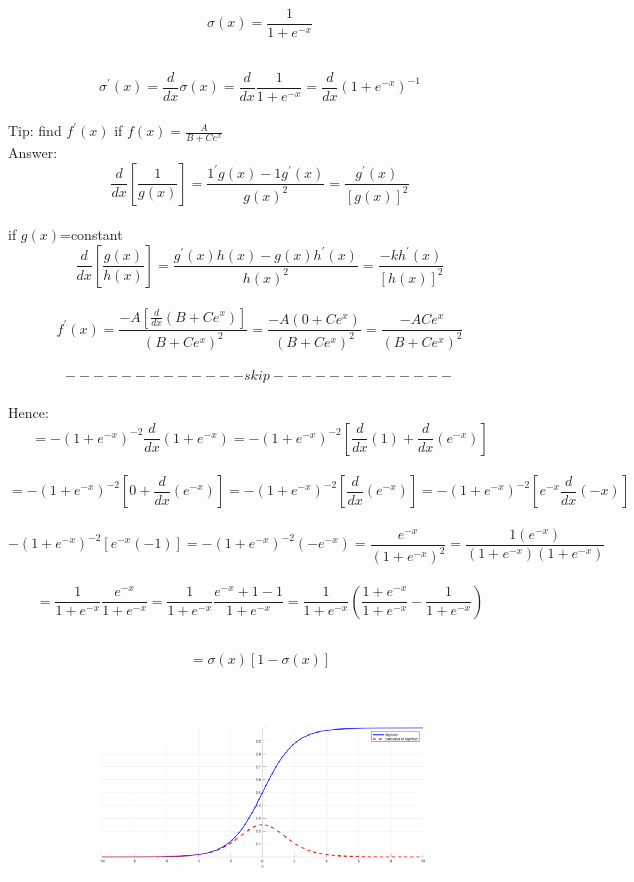 \documentclass[14pt,a4paper]{report}  %
\begin{document}
\begin{itemize}
\begin{Large}$$\sigma(x)=\frac{1}{1+e^{-x}}$$ \end{Large}\\[6pt]
$$\sigma^{'}(x)=\frac{d}{dx}\sigma(x)=\frac{d}{dx}\frac{1}{1+e^{-x}}=\frac{d}{dx}(1+e^{-x})^{-1}$$\\[6pt]
Tip: find $f^{'}(x)$ if $f(x)=\frac{A}{B+Ce^{x}}$\\
Answer:\\
$$\frac{d}{dx}[\frac{1}{g(x)}]=\frac{1^{'}g(x)-1g^{'}(x)}{g(x)^2}=\frac{g^{'}(x)}{[g(x)]^2}$$\\
if $g(x)$=constant\\
$$\frac{d}{dx}[\frac{g(x)}{h(x)}]=\frac{g^{'}(x)h(x)-g(x)h^{'}(x)}{h(x)^2}= \frac{-kh^{'}(x)}{[h(x)]^2}$$\\
$$f^{'}(x)=\frac{-A[\frac{d}{dx}(B+Ce^x)]}{(B+Ce^x)^2}=\frac{-A(0+Ce^x)}{(B+Ce^x)^2}=\frac{-ACe^x}{(B+Ce^x)^2}$$\\[6pt]
$$-------------skip-------------$$\\[6pt]
Hence:\\
$$=-(1+e^{-x})^{-2}\frac{d}{dx}(1+e^{-x})=-(1+e^{-x})^{-2}[\frac{d}{dx}(1)+\frac{d}{dx}(e^{-x})]$$\\
$$=-(1+e^{-x})^{-2}[0+\frac{d}{dx}(e^{-x})]=-(1+e^{-x})^{-2}[\frac{d}{dx}(e^{-x})]=-(1+e^{-x})^{-2}[e^{-x}\frac{d}{dx}(-x)]$$\\
$$-(1+e^{-x})^{-2}[e^{-x}(-1)]=-(1+e^{-x})^{-2}(-e^{-x})=\frac{e^{-x}}{(1+e^{-x})^2}=\frac{1(e^{-x})}{(1+e^{-x})(1+e^{-x})}$$\\
$$=\frac{1}{1+e^{-x}}\frac{e^{-x}}{1+e^{-x}}=\frac{1}{1+e^{-x}}\frac{e^{-x}+1-1}{1+e^{-x}}=\frac{1}{1+e^{-x}}(\frac{1+e^{-x}}{1+e^{-x}}-\frac{1}{1+e^{-x}})$$\\[6pt]
\begin{Large}$$=\sigma(x)[1-\sigma(x)]$$\end{Large}\\
\begin{figure}[hbt!]
\begin{center}
\includegraphics[scale=0.80]{sigmoidprime}

\end{center}
\end{figure}
\end{itemize}
\end{document}
